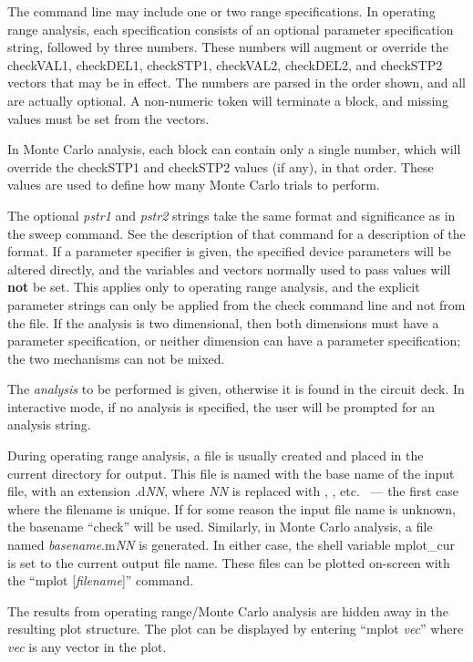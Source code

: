 The command line may include one or two range specifications.  In
operating range analysis, each specification consists of an optional
parameter specification string, followed by three numbers.  These
numbers will augment or override the {\vt checkVAL1}, {\vt checkDEL1},
{\vt checkSTP1}, {\vt checkVAL2}, {\vt checkDEL2}, and {\vt checkSTP2}
vectors that may be in effect.  The numbers are parsed in the order
shown, and all are actually optional.  A non-numeric token will
terminate a block, and missing values must be set from the vectors.

In Monte Carlo analysis, each block can contain only a single number,
which will override the {\vt checkSTP1} and {\vt checkSTP2} values (if
any), in that order.  These values are used to define how many Monte
Carlo trials to perform.

The optional {\it pstr1} and {\it pstr2} strings take the same format
and significance as in the {\cb sweep} command.  See the description
of that command for a description of the format.  If a parameter
specifier is given, the specified device parameters will be altered
directly, and the variables and vectors normally used to pass values
will {\bf not} be set.  This applies only to operating range analysis,
and the explicit parameter strings can only be applied from the {\cb
check} command line and not from the file.  If the analysis is two
dimensional, then both dimensions must have a parameter specification,
or neither dimension can have a parameter specification; the two
mechanisms can not be mixed.

The {\it analysis} to be performed is given, otherwise it is found in
the circuit deck.  In interactive mode, if no analysis is specified,
the user will be prompted for an analysis string.

During operating range analysis, a file is usually created and placed
in the current directory for output.  This file is named with the base
name of the input file, with an extension {\vt .d}{\it NN}, where {\it
NN} is replaced with {}, {}, etc.~ --- the first case
where the filename is unique.  If for some reason the input file name
is unknown, the basename ``check'' will be used.  Similarly, in Monte
Carlo analysis, a file named {\it basename\/}.{\vt m}{\it NN} is
generated.  In either case, the shell variable {\et mplot\_cur} is set
to the current output file name.  These files can be plotted on-screen
with the ``{\vt mplot [{\it filename\/}]}'' command.

The results from operating range/Monte Carlo analysis are hidden away
in the resulting plot structure.  The plot can be displayed by
entering ``{\vt mplot} {\it vec}'' where {\it vec} is any vector in
the plot.

